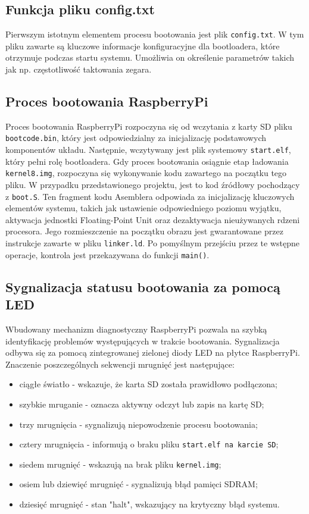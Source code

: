 \documentclass[shortabstract]{iithesis}
\begin{document}
\subsection{Funkcja pliku config.txt}
Pierwszym istotnym elementem procesu bootowania jest plik \texttt{config.txt}. W tym pliku zawarte są kluczowe informacje konfiguracyjne dla bootloadera, które otrzymuje podczas startu systemu. Umożliwia on określenie parametrów takich jak np. częstotliwość taktowania zegara. 
\subsection{Proces bootowania RaspberryPi}
Proces bootowania RaspberryPi rozpoczyna się od wczytania z karty SD pliku \texttt{bootcode.bin}, który jest odpowiedzialny za inicjalizację podstawowych komponentów układu. Następnie, wczytywany jest plik systemowy \texttt{start.elf}, który pełni rolę bootloadera. Gdy proces bootowania osiągnie etap ładowania \texttt{kernel8.img}, rozpoczyna się wykonywanie kodu zawartego na początku tego pliku. W przypadku przedstawionego projektu, jest to kod źródłowy pochodzący z \texttt{boot.S}. Ten fragment kodu Asemblera odpowiada za inicjalizację kluczowych elementów systemu, takich jak ustawienie odpowiedniego poziomu wyjątku, aktywacja jednostki Floating-Point Unit oraz dezaktywacja nieużywanych rdzeni procesora. Jego rozmieszczenie na początku obrazu jest gwarantowane przez instrukcje zawarte w pliku \texttt{linker.ld}. Po pomyślnym przejściu przez te wstępne operacje, kontrola jest przekazywana do funkcji \texttt{main()}.
\subsection{Sygnalizacja statusu bootowania za pomocą LED}
Wbudowany mechanizm diagnostyczny RaspberryPi pozwala na szybką identyfikację problemów występujących w trakcie bootowania. Sygnalizacja odbywa się za pomocą zintegrowanej zielonej diody LED na płytce RaspberryPi. Znaczenie poszczególnych sekwencji mrugnięć jest następujące:
\begin{itemize}
 \item ciągłe światło - wskazuje, że karta SD została prawidłowo podłączona;
 \item szybkie mruganie - oznacza aktywny odczyt lub zapis na kartę SD;
 \item trzy mrugnięcia - sygnalizują niepowodzenie procesu bootowania;
 \item cztery mrugnięcia - informują o braku pliku \texttt{start.elf na karcie SD};
 \item siedem mrugnięć - wskazują na brak pliku \texttt{kernel.img};
 \item osiem lub dziewięć mrugnięć - sygnalizują błąd pamięci SDRAM;
 \item dziesięć mrugnięć - stan "halt", wskazujący na krytyczny błąd systemu.
\end{itemize}
\end{document}
